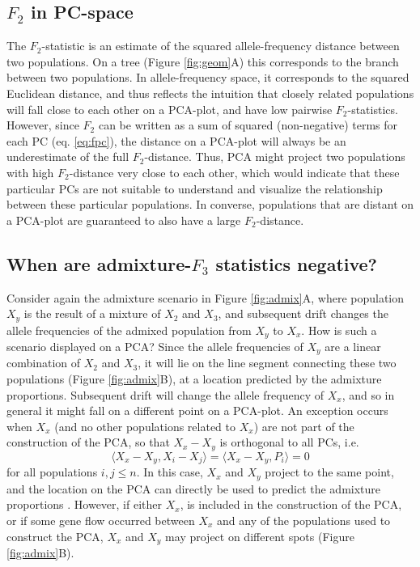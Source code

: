 \documentclass[12pt,fullpage, a4paper]{article}
\begin{document}
\subsection{$F_2$ in PC-space}
The $F_2$-statistic is an estimate of the squared allele-frequency distance between two
populations. On a tree (Figure \ref{fig:geom}A) this corresponds to the branch between two populations. In allele-frequency space, it corresponds to the squared Euclidean distance, and thus reflects the intuition that closely related populations  will fall close to each other on a PCA-plot, and have low pairwise $F_2$-statistics. However, since $F_2$ can be written as  a sum of squared (non-negative) terms for each PC (eq. \ref{eq:fpc}), the distance on a PCA-plot will always be an underestimate of the full $F_2$-distance. Thus, PCA might project two populations with high $F_2$-distance very close to each other, which would indicate that these particular PCs are not suitable to  understand and visualize the relationship between these particular populations. In converse, populations that are distant on a PCA-plot are guaranteed to also have a large $F_2$-distance.

\subsection{When are admixture-$F_3$ statistics negative?}
Consider again the admixture scenario in Figure \ref{fig:admix}A, where population $X_y$ is the result of a mixture of $X_2$ and $X_3$, and subsequent drift changes the allele frequencies of the admixed population from $X_y$ to $X_x$. How is such a scenario displayed on a PCA?  Since the allele frequencies of $X_y$ are a linear combination of $X_2$ and $X_3$, it will lie on the line segment connecting these two populations (Figure \ref{fig:admix}B), at a location predicted by the admixture proportions. Subsequent drift will change the allele frequency of $X_x$, and so in general it might fall on a different point on a PCA-plot. An exception occurs when $X_x$ (and no other populations related to $X_x$) are not part of the construction of the PCA, so that $X_x - X_y$ is orthogonal to all PCs, i.e. $$\langle X_x - X_y, X_i - X_j \rangle = \langle X_x - X_y, P_i \rangle = 0$$ for all populations $i,j \leq n$. In this case, $X_x$ and $X_y$ project to the same point, and the location on the PCA  can directly be used to predict the admixture proportions \citep{mcvean2009, brisbin2012, oteo-garcia2021}. However, if either $X_x$, is included in the construction of the PCA, or if some gene flow occurred between $X_x$ and any of the populations used to construct the PCA, $X_x$ and $X_y$ may project on different spots (Figure \ref{fig:admix}B). 
\end{document}
